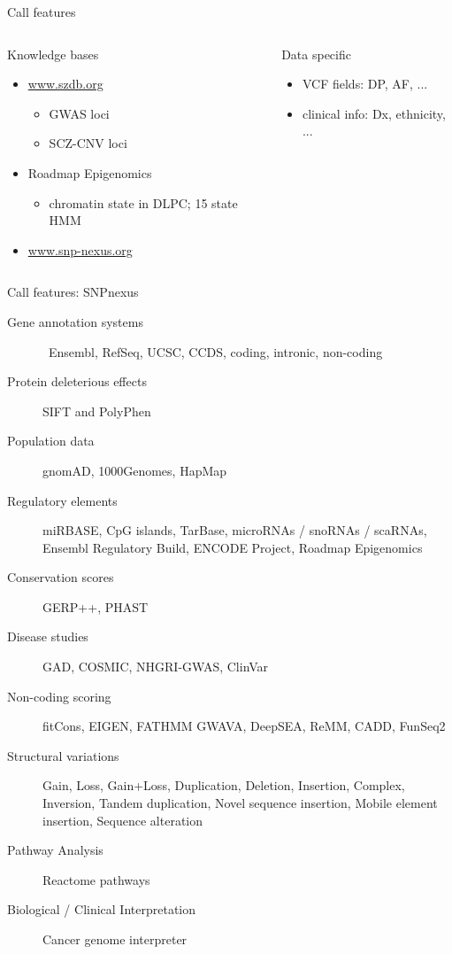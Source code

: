 \documentclass[usenames,dvipsnames]{beamer}
\begin{document}
\begin{frame}{Call features}
\begin{columns}[t]
\begin{column}{0.5\textwidth}
	Knowledge bases
\begin{itemize}
\item \url{www.szdb.org}
\begin{itemize}
\item GWAS loci
\item SCZ-CNV loci
\end{itemize}
\item Roadmap Epigenomics
\begin{itemize}
\item chromatin state in DLPC; 15 state HMM
\end{itemize}
\item \url{www.snp-nexus.org}
\end{itemize}
\end{column}

\begin{column}{0.5\textwidth}
	Data specific
\begin{itemize}
\item VCF fields: DP, AF, ...
\item clinical info: Dx, ethnicity, ...
\end{itemize}
\end{column}
\end{columns}
\end{frame}

\begin{frame}{Call features: SNPnexus}
	\tiny
	\begin{description}
		\item[Gene annotation systems]  Ensembl, RefSeq, UCSC, CCDS, coding, intronic, non-coding
                \item[Protein deleterious effects] SIFT and PolyPhen
                \item[Population data] gnomAD, 1000Genomes, HapMap
                \item[Regulatory elements] miRBASE, CpG islands, TarBase, microRNAs / snoRNAs / scaRNAs, Ensembl Regulatory Build, ENCODE Project, Roadmap Epigenomics 
                \item[Conservation scores] GERP++, PHAST 
                \item[Disease studies] GAD, COSMIC, NHGRI-GWAS, ClinVar
                \item[Non-coding scoring] fitCons, EIGEN, FATHMM GWAVA, DeepSEA, ReMM, CADD, FunSeq2 
                \item[Structural variations] Gain, Loss, Gain+Loss, Duplication, Deletion, Insertion, Complex, Inversion, Tandem duplication, Novel sequence insertion, Mobile element insertion, Sequence alteration 
                \item[Pathway Analysis] Reactome pathways 
                \item[Biological / Clinical Interpretation] Cancer genome interpreter 
	\end{description}
\end{frame}
\end{document}
